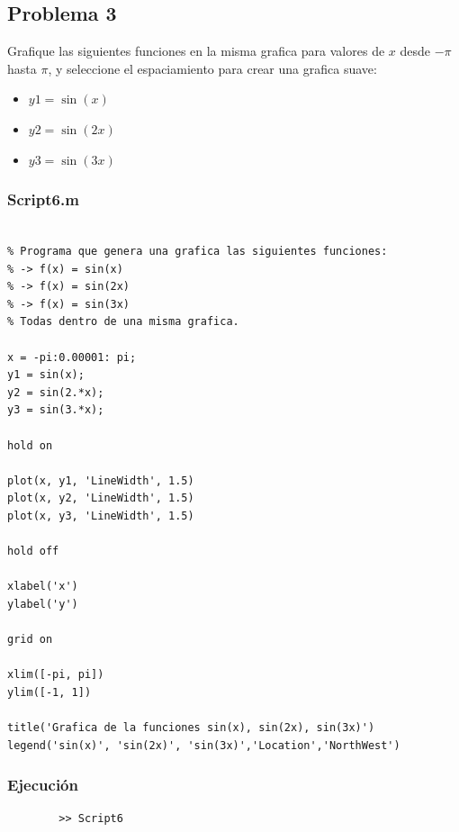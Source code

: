 \documentclass{article}
\begin{document}
	\newpage
	
	\subsection{Problema 3}
	
	Grafique las siguientes funciones en la misma grafica para valores de $x$ desde $-\pi$ hasta $\pi$, y seleccione el espaciamiento para crear una grafica suave:
	
	\begin{itemize}
		\centering
		\item $y1 = \sin(x)$
		\item $y2 = \sin(2x)$
		\item $y3 = \sin(3x)$
	\end{itemize}
	
	\subsubsection{Script6.m}
	
	\begin{lstlisting}

% Programa que genera una grafica las siguientes funciones:
% -> f(x) = sin(x)
% -> f(x) = sin(2x)
% -> f(x) = sin(3x)
% Todas dentro de una misma grafica.

x = -pi:0.00001: pi;
y1 = sin(x);
y2 = sin(2.*x);
y3 = sin(3.*x);

hold on

plot(x, y1, 'LineWidth', 1.5)
plot(x, y2, 'LineWidth', 1.5)
plot(x, y3, 'LineWidth', 1.5)

hold off

xlabel('x')
ylabel('y')

grid on

xlim([-pi, pi])
ylim([-1, 1])

title('Grafica de la funciones sin(x), sin(2x), sin(3x)')
legend('sin(x)', 'sin(2x)', 'sin(3x)','Location','NorthWest')

	\end{lstlisting}	
	
	\subsubsection{Ejecución}
	
	\begin{lstlisting}
		>> Script6
	\end{lstlisting}
	
	\newpage
	
\end{document}
